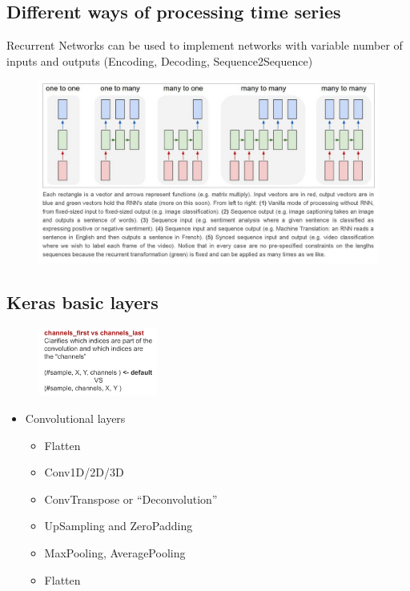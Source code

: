 \begin{figure}[ht]
\begin{subfigure}{.33\textwidth}
	\end{subfigure}
\end{figure}

\subsection{Different ways of processing time series}

Recurrent Networks can be used to implement networks with variable number of inputs and outputs (Encoding, Decoding, Sequence2Sequence)

\begin{figure}[ht]
	\centering
	\includegraphics[width=1\linewidth]{figure_ml/t_series.png}
\end{figure}
\FloatBarrier


\subsection{Keras basic layers}


\begin{figure}
	\includegraphics[width=0.35\textwidth]{figure_ml/keras_layers.png}
\end{figure}
\quad
\begin{itemize}
	\item Convolutional layers
	\begin{itemize}
		\item Flatten
		\item Conv1D/2D/3D
		\item ConvTranspose or “Deconvolution”
		\item UpSampling and ZeroPadding
		\item MaxPooling, AveragePooling
		\item Flatten
	\end{itemize}
\end{itemize}


